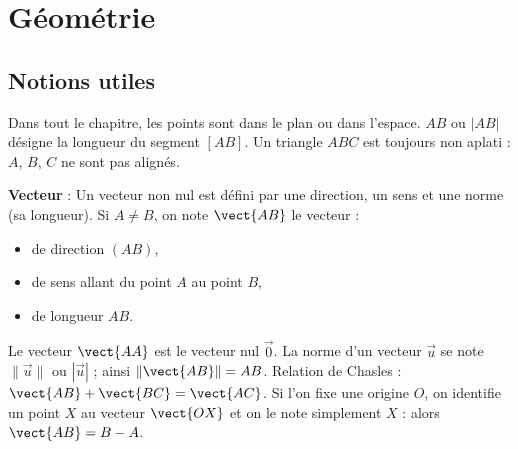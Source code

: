 \chapter{Géométrie}
%
%
%
%
%

\section*{Notions utiles}

Dans tout le chapitre, les points sont dans le plan ou dans l'espace. $AB$ ou $|AB|$ désigne la longueur du segment $[AB]$. Un triangle $ABC$ est toujours non aplati : $A$, $B$, $C$ ne sont pas alignés.

\textbf{Vecteur} : Un vecteur non nul est défini par une direction, un sens et une norme (sa longueur). Si $A\neq B$, on note $\vect{AB}$ le vecteur :
    \begin{itemize}
        \item de direction $(AB)$,
        \item de sens allant du point $A$ au point $B$,
        \item de longueur $AB$.
    \end{itemize}
Le vecteur $\vect{AA}$ est le vecteur nul $\vec{0}$. La norme d'un vecteur $\vec{u}$ se note $\|\vec{u}\|$ ou $|\vec{u}|$ ; ainsi $\|\vect{AB}\|=AB$.
Relation de Chasles : $\vect{AB} + \vect{BC} = \vect{AC}$. Si l'on fixe une origine $O$, on identifie un point $X$ au vecteur $\vect{OX}$ et on le note simplement $X$ : alors $\vect{AB} = B - A$.

